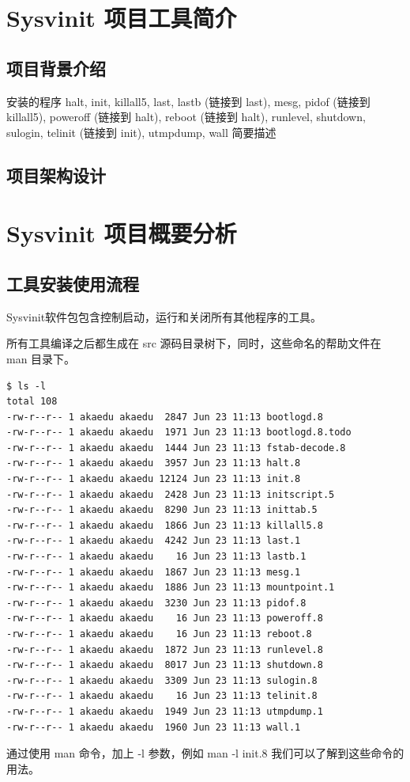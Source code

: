 \chapter{Sysvinit 项目工具简介}

\section{项目背景介绍}

安装的程序 halt, init, killall5, last, lastb (链接到 last), mesg, pidof
(链接到 killall5), poweroff (链接到 halt), reboot (链接到 halt),
runlevel, shutdown, sulogin, telinit (链接到 init), utmpdump, wall
简要描述

\section{项目架构设计}

\chapter{Sysvinit 项目概要分析}

\section{工具安装使用流程}

Sysvinit软件包包含控制启动，运行和关闭所有其他程序的工具。

所有工具编译之后都生成在 src 源码目录树下，同时，这些命名的帮助文件在 man
目录下。

{\begin{shaded}\begin{verbatim}
$ ls -l
total 108
-rw-r--r-- 1 akaedu akaedu  2847 Jun 23 11:13 bootlogd.8
-rw-r--r-- 1 akaedu akaedu  1971 Jun 23 11:13 bootlogd.8.todo
-rw-r--r-- 1 akaedu akaedu  1444 Jun 23 11:13 fstab-decode.8
-rw-r--r-- 1 akaedu akaedu  3957 Jun 23 11:13 halt.8
-rw-r--r-- 1 akaedu akaedu 12124 Jun 23 11:13 init.8
-rw-r--r-- 1 akaedu akaedu  2428 Jun 23 11:13 initscript.5
-rw-r--r-- 1 akaedu akaedu  8290 Jun 23 11:13 inittab.5
-rw-r--r-- 1 akaedu akaedu  1866 Jun 23 11:13 killall5.8
-rw-r--r-- 1 akaedu akaedu  4242 Jun 23 11:13 last.1
-rw-r--r-- 1 akaedu akaedu    16 Jun 23 11:13 lastb.1
-rw-r--r-- 1 akaedu akaedu  1867 Jun 23 11:13 mesg.1
-rw-r--r-- 1 akaedu akaedu  1886 Jun 23 11:13 mountpoint.1
-rw-r--r-- 1 akaedu akaedu  3230 Jun 23 11:13 pidof.8
-rw-r--r-- 1 akaedu akaedu    16 Jun 23 11:13 poweroff.8
-rw-r--r-- 1 akaedu akaedu    16 Jun 23 11:13 reboot.8
-rw-r--r-- 1 akaedu akaedu  1872 Jun 23 11:13 runlevel.8
-rw-r--r-- 1 akaedu akaedu  8017 Jun 23 11:13 shutdown.8
-rw-r--r-- 1 akaedu akaedu  3309 Jun 23 11:13 sulogin.8
-rw-r--r-- 1 akaedu akaedu    16 Jun 23 11:13 telinit.8
-rw-r--r-- 1 akaedu akaedu  1949 Jun 23 11:13 utmpdump.1
-rw-r--r-- 1 akaedu akaedu  1960 Jun 23 11:13 wall.1
\end{verbatim}\end{shaded}}
通过使用 man 命令，加上 -l 参数，例如 man -l init.8
我们可以了解到这些命令的用法。

